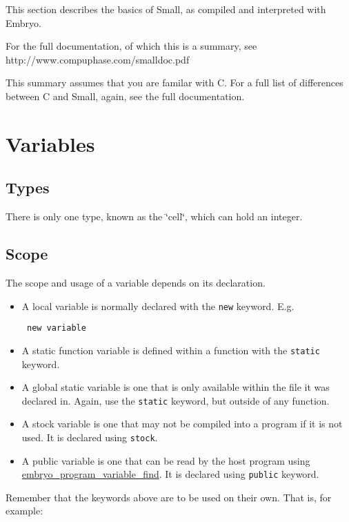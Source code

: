 This section describes the basics of Small, as compiled and interpreted with Embryo.

For the full documentation, of which this is a summary, see   http://www.compuphase.com/smalldoc.pdf 

This summary assumes that you are familar with C. For a full list of differences between C and Small, again, see the full documentation.\hypertarget{Small_Page_Small_Variables_Section}{}\section{Variables}\label{Small_Page_Small_Variables_Section}
\hypertarget{Small_Page_Small_Type_Subsection}{}\subsection{Types}\label{Small_Page_Small_Type_Subsection}
There is only one type, known as the \char`\"{}cell\char`\"{}, which can hold an integer.\hypertarget{Small_Page_Small_Scope_Subsection}{}\subsection{Scope}\label{Small_Page_Small_Scope_Subsection}
The scope and usage of a variable depends on its declaration.

\begin{itemize}
\item A local variable is normally declared with the {\tt new} keyword. E.g. 

\begin{Code}\begin{verbatim} new variable 
\end{verbatim}
\end{Code}

 \item A static function variable is defined within a function with the {\tt static} keyword. \item A global static variable is one that is only available within the file it was declared in. Again, use the {\tt static} keyword, but outside of any function. \item A stock variable is one that may not be compiled into a program if it is not used. It is declared using {\tt stock}. \item A public variable is one that can be read by the host program using \hyperlink{group__Embryo__Public__Variable__Group_g9714d1cbd46b3b0315a71c23413ad921}{embryo\_\-program\_\-variable\_\-find}. It is declared using {\tt public} keyword.\end{itemize}
Remember that the keywords above are to be used on their own. That is, for example: 

